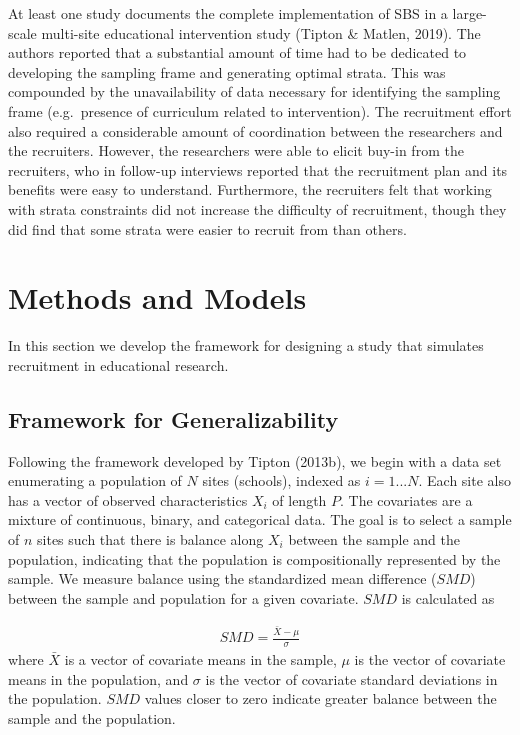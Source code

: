 \documentclass[man,floatsintext]{apa6}
\begin{document}
At least one study documents the complete implementation of SBS in a large-scale multi-site educational intervention study (Tipton \& Matlen, 2019). The authors reported that a substantial amount of time had to be dedicated to developing the sampling frame and generating optimal strata. This was compounded by the unavailability of data necessary for identifying the sampling frame (e.g.~presence of curriculum related to intervention). The recruitment effort also required a considerable amount of coordination between the researchers and the recruiters. However, the researchers were able to elicit buy-in from the recruiters, who in follow-up interviews reported that the recruitment plan and its benefits were easy to understand. Furthermore, the recruiters felt that working with strata constraints did not increase the difficulty of recruitment, though they did find that some strata were easier to recruit from than others.

\hypertarget{methods-and-models}{%
\section{Methods and Models}\label{methods-and-models}}

In this section we develop the framework for designing a study that simulates recruitment in educational research.

\hypertarget{framework-for-generalizability}{%
\subsection{Framework for Generalizability}\label{framework-for-generalizability}}

Following the framework developed by Tipton (2013b), we begin with a data set enumerating a population of \(N\) sites (schools), indexed as \(i = 1 ... N\). Each site also has a vector of observed characteristics \(X_i\) of length \(P\). The covariates are a mixture of continuous, binary, and categorical data. The goal is to select a sample of \(n\) sites such that there is balance along \(X_i\) between the sample and the population, indicating that the population is compositionally represented by the sample. We measure balance using the standardized mean difference (\(SMD\)) between the sample and population for a given covariate. \(SMD\) is calculated as

\begin{align} \label{eq:SMD}
SMD = \frac{\bar{X}-\mu}{\sigma}
\end{align}
where \(\bar{X}\) is a vector of covariate means in the sample, \(\mu\) is the vector of covariate means in the population, and \(\sigma\) is the vector of covariate standard deviations in the population. \(SMD\) values closer to zero indicate greater balance between the sample and the population.
\end{document}
